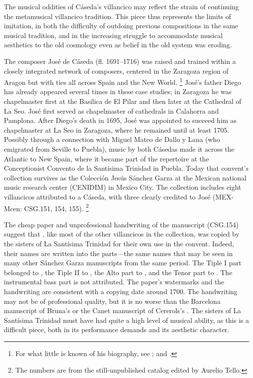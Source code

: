 The musical oddities of Cáseda's villancico may reflect the strain of continuing the metamusical villancico tradition.
This piece thus represents the limits of imitation, in both the difficulty of outdoing previous compositions in the same musical tradition, and in the increasing struggle to accommodate musical aesthetics to the old cosmology even as belief in the old system was eroding.

The composer José de Cáseda (fl. 1691--1716) was raised and trained within a closely integrated network of composers, centered in the Zaragoza region of Aragon but with ties all across Spain and the New World.%
	\footnote{
For what little is known of his biography, see \autocite[120--121]{Calahorra:Zaragoza2}; and \autocite{Stevenson:CasedaD}. 
	}
José's father Diego has already appeared several times in these case studies; in Zaragoza he was chapelmaster first at the Basilica de El Pilar and then later at the Cathedral of La Seo.
José first served as chapelmaster of cathedrals in Calahorra and Pamplona. 
After Diego's death in 1695, José was appointed to succeed him as chapelmaster at La Seo in Zaragoza, where he remained until at least 1705.
Possibly through a connection with Miguel Mateo de Dallo y Lana (who emigrated from Seville to Puebla), music by both Cásedas made it across the Atlantic to New Spain, where it became part of the repertoire at the Conceptionist Convento de la Santísima Trinidad in Puebla.
Today that convent's collection survives as the Colección Jesús Sánchez Garza at the Mexican national music research center (CENIDIM) in Mexico City.
The collection includes eight villancicos attributed to a Cáseda, with three clearly credited to José (MEX-Mcen: CSG.151, 154, 155).%
	\footnote{
	The numbers are from the still-unpublished catalog edited by Aurelio Tello.
	}

The cheap paper and unprofessional handwriting of the manuscript (CSG.154) suggest that , like most of the other villancicos in the collection, was copied by the sisters of La Santísima Trinidad for their own use in the convent.
Indeed, their names are written into the parts---the same names that may be seen in many other Sánchez Garza manuscripts from the same period.
The Tiple I part belonged to , the Tiple II to , the Alto part to , and the Tenor part to .
The instrumental bass part is not attributed.
The paper's watermarks and the handwriting are consistent with a copying date around 1700.
The handwriting may not be of professional quality, but it is no worse than the Barcelona manuscript of Bruna's  or the Canet manuscript of Cererols's . 
The sisters of La Santísima Trinidad must have had quite a high level of musical ability, as this is a difficult piece, both in its performance demands and its aesthetic character. 

